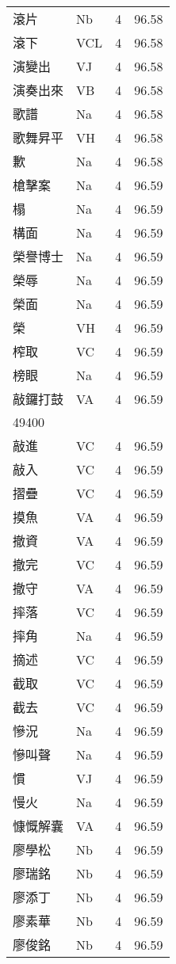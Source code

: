 \documentclass[twocolumn]{book}
\begin{document}
\begin{supertabular}{llrr}
滾片 & Nb & 4 &  96.58\\
滾下 & VCL & 4 &  96.58\\
演變出 & VJ & 4 &  96.58\\
演奏出來 & VB & 4 &  96.58\\
歌譜 & Na & 4 &  96.58\\
歌舞昇平 & VH & 4 &  96.58\\
歉 & Na & 4 &  96.58\\
槍擊案 & Na & 4 &  96.59\\
榻 & Na & 4 &  96.59\\
構面 & Na & 4 &  96.59\\
榮譽博士 & Na & 4 &  96.59\\
榮辱 & Na & 4 &  96.59\\
榮面 & Na & 4 &  96.59\\
榮 & VH & 4 &  96.59\\
榨取 & VC & 4 &  96.59\\
榜眼 & Na & 4 &  96.59\\
敲鑼打鼓 & VA & 4 &  96.59\\
49400\\
敲進 & VC & 4 &  96.59\\
敲入 & VC & 4 &  96.59\\
摺疊 & VC & 4 &  96.59\\
摸魚 & VA & 4 &  96.59\\
撤資 & VA & 4 &  96.59\\
撤完 & VC & 4 &  96.59\\
撤守 & VA & 4 &  96.59\\
摔落 & VC & 4 &  96.59\\
摔角 & Na & 4 &  96.59\\
摘述 & VC & 4 &  96.59\\
截取 & VC & 4 &  96.59\\
截去 & VC & 4 &  96.59\\
慘況 & Na & 4 &  96.59\\
慘叫聲 & Na & 4 &  96.59\\
慣 & VJ & 4 &  96.59\\
慢火 & Na & 4 &  96.59\\
慷慨解囊 & VA & 4 &  96.59\\
廖學松 & Nb & 4 &  96.59\\
廖瑞銘 & Nb & 4 &  96.59\\
廖添丁 & Nb & 4 &  96.59\\
廖素華 & Nb & 4 &  96.59\\
廖俊銘 & Nb & 4 &  96.59\\

\end{supertabular}
\end{document}
